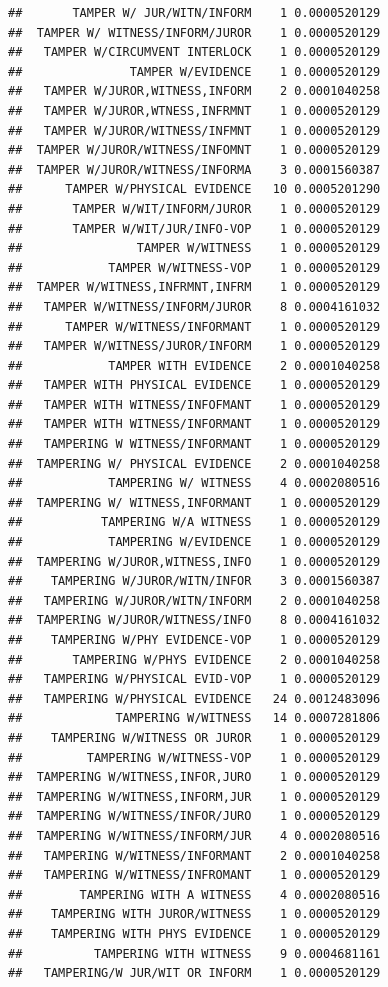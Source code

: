 \documentclass[]{book}
\begin{document}
\begin{verbatim}
##       TAMPER W/ JUR/WITN/INFORM    1 0.0000520129
##  TAMPER W/ WITNESS/INFORM/JUROR    1 0.0000520129
##   TAMPER W/CIRCUMVENT INTERLOCK    1 0.0000520129
##               TAMPER W/EVIDENCE    1 0.0000520129
##   TAMPER W/JUROR,WITNESS,INFORM    2 0.0001040258
##   TAMPER W/JUROR,WTNESS,INFRMNT    1 0.0000520129
##   TAMPER W/JUROR/WITNESS/INFMNT    1 0.0000520129
##  TAMPER W/JUROR/WITNESS/INFOMNT    1 0.0000520129
##  TAMPER W/JUROR/WITNESS/INFORMA    3 0.0001560387
##      TAMPER W/PHYSICAL EVIDENCE   10 0.0005201290
##       TAMPER W/WIT/INFORM/JUROR    1 0.0000520129
##       TAMPER W/WIT/JUR/INFO-VOP    1 0.0000520129
##                TAMPER W/WITNESS    1 0.0000520129
##            TAMPER W/WITNESS-VOP    1 0.0000520129
##  TAMPER W/WITNESS,INFRMNT,INFRM    1 0.0000520129
##   TAMPER W/WITNESS/INFORM/JUROR    8 0.0004161032
##      TAMPER W/WITNESS/INFORMANT    1 0.0000520129
##   TAMPER W/WITNESS/JUROR/INFORM    1 0.0000520129
##            TAMPER WITH EVIDENCE    2 0.0001040258
##   TAMPER WITH PHYSICAL EVIDENCE    1 0.0000520129
##   TAMPER WITH WITNESS/INFOFMANT    1 0.0000520129
##   TAMPER WITH WITNESS/INFORMANT    1 0.0000520129
##   TAMPERING W WITNESS/INFORMANT    1 0.0000520129
##  TAMPERING W/ PHYSICAL EVIDENCE    2 0.0001040258
##            TAMPERING W/ WITNESS    4 0.0002080516
##  TAMPERING W/ WITNESS,INFORMANT    1 0.0000520129
##           TAMPERING W/A WITNESS    1 0.0000520129
##            TAMPERING W/EVIDENCE    1 0.0000520129
##  TAMPERING W/JUROR,WITNESS,INFO    1 0.0000520129
##    TAMPERING W/JUROR/WITN/INFOR    3 0.0001560387
##   TAMPERING W/JUROR/WITN/INFORM    2 0.0001040258
##  TAMPERING W/JUROR/WITNESS/INFO    8 0.0004161032
##    TAMPERING W/PHY EVIDENCE-VOP    1 0.0000520129
##       TAMPERING W/PHYS EVIDENCE    2 0.0001040258
##   TAMPERING W/PHYSICAL EVID-VOP    1 0.0000520129
##   TAMPERING W/PHYSICAL EVIDENCE   24 0.0012483096
##             TAMPERING W/WITNESS   14 0.0007281806
##    TAMPERING W/WITNESS OR JUROR    1 0.0000520129
##         TAMPERING W/WITNESS-VOP    1 0.0000520129
##  TAMPERING W/WITNESS,INFOR,JURO    1 0.0000520129
##  TAMPERING W/WITNESS,INFORM,JUR    1 0.0000520129
##  TAMPERING W/WITNESS/INFOR/JURO    1 0.0000520129
##  TAMPERING W/WITNESS/INFORM/JUR    4 0.0002080516
##   TAMPERING W/WITNESS/INFORMANT    2 0.0001040258
##   TAMPERING W/WITNESS/INFROMANT    1 0.0000520129
##        TAMPERING WITH A WITNESS    4 0.0002080516
##    TAMPERING WITH JUROR/WITNESS    1 0.0000520129
##    TAMPERING WITH PHYS EVIDENCE    1 0.0000520129
##          TAMPERING WITH WITNESS    9 0.0004681161
##   TAMPERING/W JUR/WIT OR INFORM    1 0.0000520129

\end{verbatim}
\end{document}
